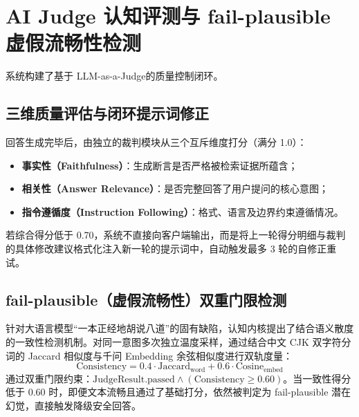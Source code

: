 \section{AI Judge 认知评测与 fail-plausible 虚假流畅性检测}

系统构建了基于 LLM-as-a-Judge\cite{Zheng2023Judging}的质量控制闭环。

\subsection{三维质量评估与闭环提示词修正}
回答生成完毕后，由独立的裁判模块从三个互斥维度打分（满分 1.0）：
\begin{itemize}
    \item \textbf{事实性（Faithfulness）}：生成断言是否严格被检索证据所蕴含；
    \item \textbf{相关性（Answer Relevance）}：是否完整回答了用户提问的核心意图；
    \item \textbf{指令遵循度（Instruction Following）}：格式、语言及边界约束遵循情况。
\end{itemize}
若综合得分低于 0.70，系统不直接向客户端输出，而是将上一轮得分明细与裁判的具体修改建议格式化注入新一轮的提示词中，自动触发最多 3 轮的自修正重试。

\subsection{fail-plausible（虚假流畅性）双重门限检测}
针对大语言模型“一本正经地胡说八道”的固有缺陷，认知内核提出了结合语义散度的一致性检测机制。对同一意图多次独立温度采样，通过结合中文 CJK 双字符分词的 Jaccard 相似度与千问 Embedding 余弦相似度进行双轨度量：
\begin{equation}
    \text{Consistency} = 0.4 \cdot \text{Jaccard}_{\text{word}} + 0.6 \cdot \text{Cosine}_{\text{embed}}
\end{equation}
通过双重门限约束：$\text{JudgeResult.passed} \land (\text{Consistency} \ge 0.60)$。当一致性得分低于 0.60 时，即便文本流畅且通过了基础打分，依然被判定为 fail-plausible 潜在幻觉，直接触发降级安全回答。
